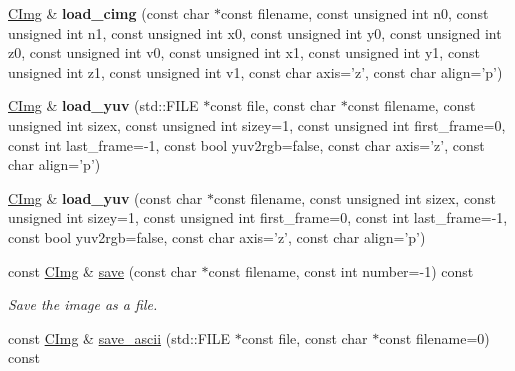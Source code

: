 \begin{DoxyCompactItemize}
\item 
\hypertarget{structcimg__library_1_1_c_img_aeb48c61d7a1565132208f4b4ee10c8cc}{\hyperlink{structcimg__library_1_1_c_img}{C\-Img} \& {\bfseries load\-\_\-cimg} (const char $\ast$const filename, const unsigned int n0, const unsigned int n1, const unsigned int x0, const unsigned int y0, const unsigned int z0, const unsigned int v0, const unsigned int x1, const unsigned int y1, const unsigned int z1, const unsigned int v1, const char axis='z', const char align='p')}\label{structcimg__library_1_1_c_img_aeb48c61d7a1565132208f4b4ee10c8cc}

\item 
\hypertarget{structcimg__library_1_1_c_img_a1534bc0d75e8fa8ba5945cd5fc43b5bf}{\hyperlink{structcimg__library_1_1_c_img}{C\-Img} \& {\bfseries load\-\_\-yuv} (std\-::\-F\-I\-L\-E $\ast$const file, const char $\ast$const filename, const unsigned int sizex, const unsigned int sizey=1, const unsigned int first\-\_\-frame=0, const int last\-\_\-frame=-\/1, const bool yuv2rgb=false, const char axis='z', const char align='p')}\label{structcimg__library_1_1_c_img_a1534bc0d75e8fa8ba5945cd5fc43b5bf}

\item 
\hypertarget{structcimg__library_1_1_c_img_a90b2b89e84dabc5ef2f50540348d3e5c}{\hyperlink{structcimg__library_1_1_c_img}{C\-Img} \& {\bfseries load\-\_\-yuv} (const char $\ast$const filename, const unsigned int sizex, const unsigned int sizey=1, const unsigned int first\-\_\-frame=0, const int last\-\_\-frame=-\/1, const bool yuv2rgb=false, const char axis='z', const char align='p')}\label{structcimg__library_1_1_c_img_a90b2b89e84dabc5ef2f50540348d3e5c}

\item 
const \hyperlink{structcimg__library_1_1_c_img}{C\-Img} \& \hyperlink{structcimg__library_1_1_c_img_a593d3d4f5eae665e93c3f551b2da3f03}{save} (const char $\ast$const filename, const int number=-\/1) const 
\begin{DoxyCompactList}\small\item\em Save the image as a file. \end{DoxyCompactList}\item 
\hypertarget{structcimg__library_1_1_c_img_a0347f20f842430c63ddc0ff39fd62ddf}{const \hyperlink{structcimg__library_1_1_c_img}{C\-Img} \& \hyperlink{structcimg__library_1_1_c_img_a0347f20f842430c63ddc0ff39fd62ddf}{save\-\_\-ascii} (std\-::\-F\-I\-L\-E $\ast$const file, const char $\ast$const filename=0) const }\label{structcimg__library_1_1_c_img_a0347f20f842430c63ddc0ff39fd62ddf}


\end{DoxyCompactItemize}
